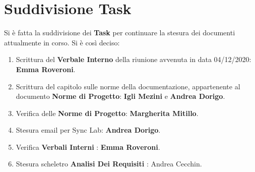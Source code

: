 	\section{Suddivisione Task}
	Si è fatta la suddivisione dei \textbf{Task} per continuare la stesura dei documenti attualmente in corso.
	Si è così deciso:
	\begin{enumerate}
		\item Scrittura del \textbf{Verbale Interno} della riunione avvenuta in data 04/12/2020: \textbf{Emma Roveroni}.
		\item Scrittura del capitolo sulle norme della documentazione, appartenente al documento \textbf{Norme di Progetto}: \textbf{Igli Mezini} e \textbf{Andrea Dorigo}.
		\item Verifica delle \textbf{Norme di Progetto}: \textbf{Margherita Mitillo}.
		\item Stesura email per Sync Lab: \textbf{Andrea Dorigo}.
		\item Verifica \textbf{Verbali Interni} : \textbf{Emma Roveroni}.
		\item Stesura scheletro \textbf{Analisi Dei Requisiti} : Andrea Cecchin.
	\end{enumerate}
